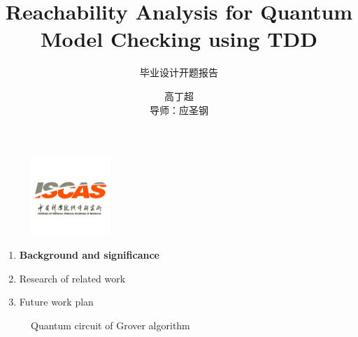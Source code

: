 \documentclass[aspectratio=1610,18pt]{ctexbeamer}
\title[TDD in quantum]{Reachability Analysis for Quantum Model Checking using TDD}
\subtitle{毕业设计开题报告}
\author{高丁超\\导师：应圣钢}
\begin{document}
\begin{frame}[plain]
  \titlepage
  \begin{figure}
    \centering
    \begin{minipage}[t]{0.48\textwidth}
    \centering
    \includegraphics[width=3cm]{iscas.png}
    \end{minipage}
  \end{figure}
\end{frame}
\begin{frame}
  \begin{enumerate}
    \Large
    \item \textbf{Background and significance}
    \item Research of related work
    \item Future work plan
  \end{enumerate}
\end{frame}
\begin{frame}
  \begin{figure}[h]
    \centering
    \caption{\Large Quantum circuit of Grover algorithm}
    \end{figure}
\end{frame}
\end{document}
